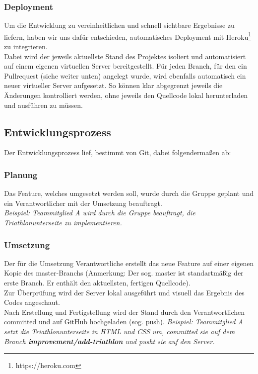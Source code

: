 \documentclass[12pt,a4paper]{article}
\begin{document}
\subsubsection{Deployment}
Um die Entwicklung zu vereinheitlichen und schnell sichtbare Ergebnisse zu liefern, haben wir uns dafür entschieden, automatisches Deployment mit Heroku\footnote{\label{foot:3}https://heroku.com} zu integrieren.\\
Dabei wird der jeweils aktuellste Stand des Projektes isoliert und automatisiert auf einem eigenen virtuellen Server bereitgestellt. Für jeden Branch, für den ein Pullrequest (siehe weiter unten) angelegt wurde, wird ebenfalls automatisch ein neuer virtueller Server aufgesetzt. So können klar abgegrenzt jeweils die Änderungen kontrolliert werden, ohne jeweils den Quellcode lokal herunterladen und ausführen zu müssen.

\subsection{Entwicklungsprozess}
Der Entwicklungsprozess lief, bestimmt von Git, dabei folgendermaßen ab:
\subsubsection{Planung}
Das Feature, welches umgesetzt werden soll, wurde durch die Gruppe geplant und ein Verantwortlicher mit der Umsetzung beauftragt. \\
\emph{Beispiel: Teammitglied A wird durch die Gruppe beauftragt, die Triathlonunterseite zu implementieren.}
\subsubsection{Umsetzung}
Der für die Umsetzung Verantwortliche erstellt das neue Feature auf einer eigenen Kopie des master-Branchs (Anmerkung: Der sog. master ist standartmäßig der erste Branch. Er enthält den aktuellsten, fertigen Quellcode).\\
Zur Überprüfung wird der Server lokal ausgeführt und visuell das Ergebnis des Codes angeschaut.\\
Nach Erstellung und Fertigstellung wird der Stand durch den Verantwortlichen committed und auf GitHub hochgeladen (sog. push). 
\emph{Beispiel: Teammitglied A setzt die Triathlonunterseite in HTML und CSS um, committed sie auf dem Branch \textbf{improvement/add-triathlon} und pusht sie auf den Server.}
\end{document}
